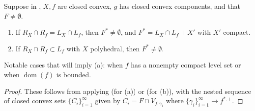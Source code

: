\begin{prop}
	Suppose in , $X,f$ are closed convex, $g$ has closed convex components, and that $F\neq\emptyset$.
	\begin{enumerate}[label=(\alph*)]
		\item If $R_X\cap R_f=L_X\cap L_f$, then $F^\ast\neq\emptyset$, and $F^\ast=L_X\cap L_f+X'$ with $X'$ compact.
		\item If $R_X\cap R_f\subset L_f$ with $X$ polyhedral, then $F^\ast\neq\emptyset$.
	\end{enumerate}
	Notable cases that will imply (a): when $f$ has a nonempty compact level set or when $\operatorname{dom}(f)$ is bounded.
\end{prop}

\begin{proof}
	These follows from applying  (for (a)) or  (for (b)), with the nested sequence of closed convex sets $\{C_i\}_{i=1}^{\infty}$ given by $C_i=F\cap V_{f,\gamma_i}$ where $\{\gamma_i\}_{i=1}^{\infty}\to f^{\ast,+}$.
\end{proof}

